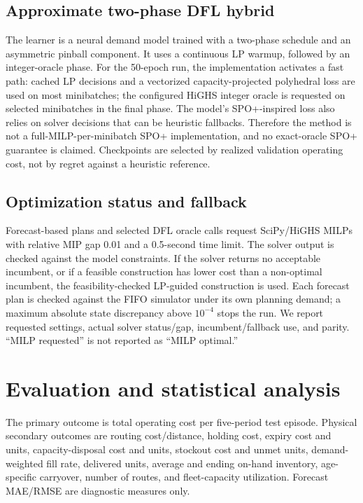 \documentclass[11pt,a4paper]{article}
\begin{document}
\subsection{Approximate two-phase DFL hybrid}

The learner is a neural demand model trained with a two-phase schedule and an asymmetric pinball component. It uses a continuous LP warmup, followed by an integer-oracle phase. For the 50-epoch run, the implementation activates a fast path: cached LP decisions and a vectorized capacity-projected polyhedral loss are used on most minibatches; the configured HiGHS integer oracle is requested on selected minibatches in the final phase. The model's SPO+-inspired loss also relies on solver decisions that can be heuristic fallbacks. Therefore the method is not a full-MILP-per-minibatch SPO+ implementation, and no exact-oracle SPO+ guarantee is claimed. Checkpoints are selected by realized validation operating cost, not by regret against a heuristic reference.

\subsection{Optimization status and fallback}

Forecast-based plans and selected DFL oracle calls request SciPy/HiGHS MILPs with relative MIP gap 0.01 and a 0.5-second time limit. The solver output is checked against the model constraints. If the solver returns no acceptable incumbent, or if a feasible construction has lower cost than a non-optimal incumbent, the feasibility-checked LP-guided construction is used. Each forecast plan is checked against the FIFO simulator under its own planning demand; a maximum absolute state discrepancy above $10^{-4}$ stops the run. We report requested settings, actual solver status/gap, incumbent/fallback use, and parity. “MILP requested” is not reported as “MILP optimal.”

\section{Evaluation and statistical analysis}

The primary outcome is total operating cost per five-period test episode. Physical secondary outcomes are routing cost/distance, holding cost, expiry cost and units, capacity-disposal cost and units, stockout cost and unmet units, demand-weighted fill rate, delivered units, average and ending on-hand inventory, age-specific carryover, number of routes, and fleet-capacity utilization. Forecast MAE/RMSE are diagnostic measures only.
\end{document}

